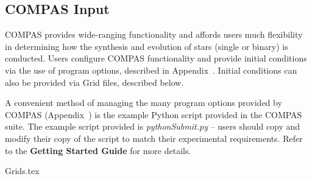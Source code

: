 \subsection{COMPAS Input}\label{sec:COMPASInput}

COMPAS provides wide-ranging functionality and affords users much flexibility in determining how the synthesis and evolution of stars (single or binary) is conducted.  Users configure COMPAS functionality and provide initial conditions via the use of program options, described in Appendix~. Initial conditions can also be provided via Grid files, described below.

A convenient method of managing the many program options provided by COMPAS (Appendix~) is the example Python script provided in the COMPAS suite. The example script provided is \textit{pythonSubmit.py} -- users should copy and modify their copy of the script to match their experimental requirements. Refer to the \textbf{Getting Started Guide} for more details.


{Grids.tex}
